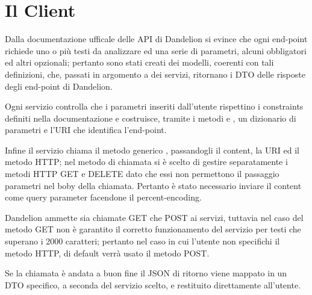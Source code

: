 \section{Il Client}

Dalla documentazione ufficale\cite{dandelion-doc} delle API di Dandelion si evince che ogni end-point richiede uno o più testi da analizzare ed una serie di parametri, 
alcuni obbligatori ed altri opzionali; 
pertanto sono stati creati dei modelli, coerenti con tali definizioni, che, passati in argomento a dei servizi, ritornano i DTO delle risposte degli end-point di Dandelion.

Ogni servizio controlla che i parametri inseriti dall'utente rispettino i constraints definiti nella documentazione e costruisce, tramite i metodi  e  
, un dizionario di parametri e l'URI che identifica l'end-point. 

Infine il servizio chiama il metodo generico , passandogli il content, la URI ed il metodo HTTP; 
nel metodo di chiamata si è scelto di gestire separatamente i metodi HTTP GET e DELETE dato che essi non permettono il passaggio parametri nel boby 
della chiamata. Pertanto è stato necessario inviare il content come query parameter facendone il percent-encoding.

Dandelion ammette sia chiamate GET che POST ai servizi, tuttavia nel caso del metodo GET non è garantito il corretto 
funzionamento del servizio per testi che superano i 2000 caratteri; pertanto nel caso in cui l'utente non specifichi il metodo HTTP, di default verrà
usato il metodo POST.

Se la chiamata è andata a buon fine il JSON di ritorno viene mappato in un DTO specifico, a seconda del servizio scelto, e restituito direttamente all'utente.

